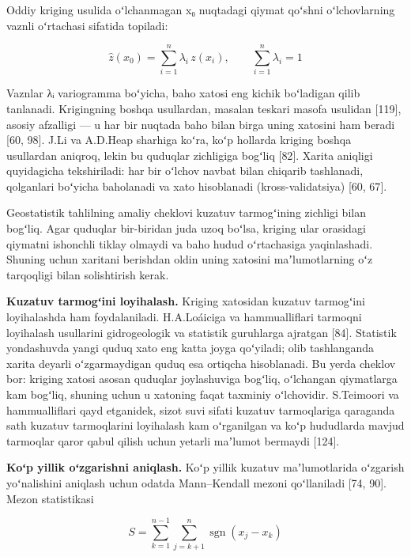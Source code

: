 \documentclass[14pt,a4paper,oneside]{extreport}
\begin{document}
Oddiy kriging usulida oʻlchanmagan x₀ nuqtadagi qiymat qoʻshni
oʻlchovlarning vaznli oʻrtachasi sifatida topiladi:

\begin{equation}\tag{1.4}
\hat{z}(x_0) = \sum_{i=1}^{n} \lambda_i \, z(x_i), \qquad \sum_{i=1}^{n} \lambda_i = 1
\end{equation}

Vaznlar λᵢ variogramma boʻyicha, baho xatosi eng kichik boʻladigan qilib
tanlanadi. Krigingning boshqa usullardan, masalan teskari masofa
usulidan {[}119{]}, asosiy afzalligi --- u har bir nuqtada baho bilan
birga uning xatosini ham beradi {[}60, 98{]}. J.Li va A.D.Heap sharhiga
koʻra, koʻp hollarda kriging boshqa usullardan aniqroq, lekin bu
quduqlar zichligiga bogʻliq {[}82{]}. Xarita aniqligi quyidagicha
tekshiriladi: har bir oʻlchov navbat bilan chiqarib tashlanadi,
qolganlari boʻyicha baholanadi va xato hisoblanadi (kross-validatsiya)
{[}60, 67{]}.

Geostatistik tahlilning amaliy cheklovi kuzatuv tarmogʻining zichligi
bilan bogʻliq. Agar quduqlar bir-biridan juda uzoq boʻlsa, kriging ular
orasidagi qiymatni ishonchli tiklay olmaydi va baho hudud oʻrtachasiga
yaqinlashadi. Shuning uchun xaritani berishdan oldin uning xatosini
maʼlumotlarning oʻz tarqoqligi bilan solishtirish kerak.

\textbf{Kuzatuv tarmogʻini loyihalash.} Kriging xatosidan kuzatuv
tarmogʻini loyihalashda ham foydalaniladi. H.A.Loáiciga va
hammualliflari tarmoqni loyihalash usullarini gidrogeologik va statistik
guruhlarga ajratgan {[}84{]}. Statistik yondashuvda yangi quduq xato eng
katta joyga qoʻyiladi; olib tashlanganda xarita deyarli oʻzgarmaydigan
quduq esa ortiqcha hisoblanadi. Bu yerda cheklov bor: kriging xatosi
asosan quduqlar joylashuviga bogʻliq, oʻlchangan qiymatlarga kam
bogʻliq, shuning uchun u xatoning faqat taxminiy oʻlchovidir. S.Teimoori
va hammualliflari qayd etganidek, sizot suvi sifati kuzatuv tarmoqlariga
qaraganda sath kuzatuv tarmoqlarini loyihalash kam oʻrganilgan va koʻp
hududlarda mavjud tarmoqlar qaror qabul qilish uchun yetarli maʼlumot
bermaydi {[}124{]}.

\textbf{Koʻp yillik oʻzgarishni aniqlash.} Koʻp yillik kuzatuv
maʼlumotlarida oʻzgarish yoʻnalishini aniqlash uchun odatda
Mann--Kendall mezoni qoʻllaniladi {[}74, 90{]}. Mezon statistikasi

\begin{equation}\tag{1.5}
S = \sum_{k=1}^{n-1} \sum_{j=k+1}^{n} \operatorname{sgn}(x_j - x_k)
\end{equation}
\end{document}
